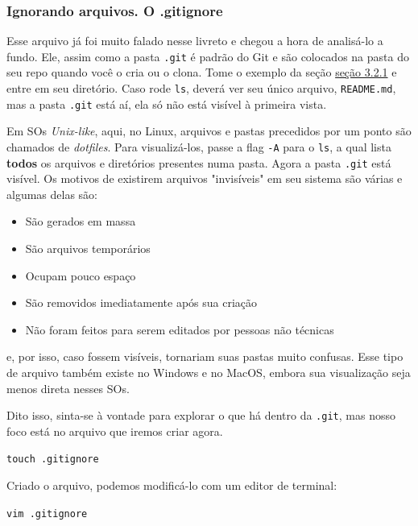 \documentclass{article}
\begin{document}
  \subsubsection{Ignorando arquivos. O .gitignore}

  Esse arquivo já foi muito falado nesse livreto e chegou a hora de analisá-lo a fundo. Ele, assim como a pasta \texttt{.git} 
  é padrão do Git e são colocados na pasta do seu repo quando você o cria ou o clona. Tome o exemplo da 
  seção \href{sec:clone}{seção 3.2.1} e entre em seu diretório. Caso rode \texttt{ls}, deverá ver seu único arquivo, 
  \texttt{README.md}, mas a pasta \texttt{.git} está aí, ela só não está visível à primeira vista.
  
  Em SOs \textit{Unix-like}, aqui, no Linux, arquivos e pastas precedidos por um ponto são chamados de \textit{dotfiles}.
  Para visualizá-los, passe a flag \texttt{-A} para o \texttt{ls}, a qual lista \textbf{todos} os arquivos e diretórios presentes numa pasta. 
  Agora a pasta \texttt{.git} está visível. Os motivos de existirem arquivos "invisíveis" em seu sistema são várias e algumas delas são:
  
  \begin{itemize}
	\item{São gerados em massa}
	\item{São arquivos temporários}
	\item{Ocupam pouco espaço}
	\item{São removidos imediatamente após sua criação}
	\item{Não foram feitos para serem editados por pessoas não técnicas}
  \end{itemize}

  e, por isso, caso fossem visíveis, tornariam suas pastas muito confusas. Esse tipo de arquivo também existe no 
  Windows e no MacOS, embora sua visualização seja menos direta nesses SOs. 
  
  Dito isso, sinta-se à vontade para explorar o que há dentro da \texttt{.git}, mas nosso foco está no arquivo que iremos criar
  agora.

  \vspace{1ex}
  \texttt{touch .gitignore}
  \vspace{1ex}

  Criado o arquivo, podemos modificá-lo com um editor de terminal:  

  \vspace{1ex}
  \texttt{vim .gitignore}
  \vspace{1ex}
\end{document}
